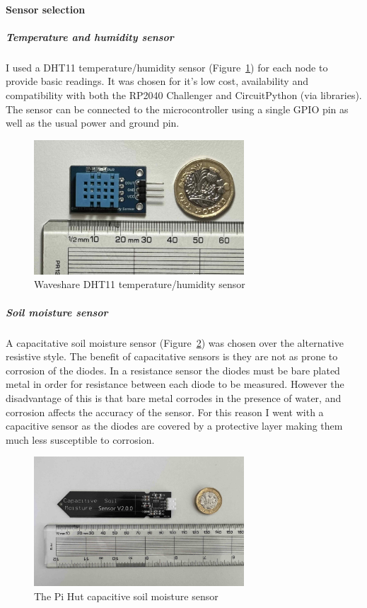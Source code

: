 \paragraph{Sensor selection} \label{sec:sensor-selection}

\subparagraph{Temperature and humidity sensor}

I used a DHT11 temperature/humidity sensor (Figure~\ref{fig:dht11}) for each
node to provide basic readings. It was chosen for it's low cost, availability
and compatibility with both the RP2040 Challenger and CircuitPython (via
libraries). The sensor can be connected to the microcontroller using a single
GPIO pin as well as the usual power and ground pin.

\begin{figure}[H]
    \centering
    \includegraphics[width=0.7\textwidth]{contents/part-2/fig2/dht11.jpg}
    \caption{Waveshare DHT11 temperature/humidity sensor}
    \label{fig:dht11}
\end{figure}

\subparagraph{Soil moisture sensor}

A capacitative soil moisture sensor (Figure~\ref{fig:soil-sensor}) was chosen
over the alternative resistive style. The benefit of capacitative sensors is
they are not as prone to corrosion of the diodes. In a resistance sensor the
diodes must be bare plated metal in order for resistance between each diode to
be measured. However the disadvantage of this is that bare metal corrodes in the
presence of water, and corrosion affects the accuracy of the sensor. For this
reason I went with a capacitive sensor as the diodes are covered by a protective
layer making them much less susceptible to corrosion.

\begin{figure}[H]
    \centering
    \includegraphics[width=0.7\textwidth]{contents/part-2/fig2/soil-sensor.jpg}
    \caption{The Pi Hut capacitive soil moisture sensor}
    \label{fig:soil-sensor}
\end{figure}



